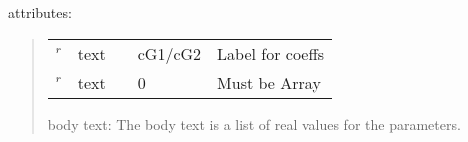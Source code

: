 \documentclass[letterpaper,10pt,english]{sphinxmanual}
\begin{document}
attributes:
\begin{quote}


\begin{savenotes}\sphinxattablestart
\centering
\begin{tabulary}{\linewidth}[t]{|T|T|T|T|T|}
\hline
\sphinxstyletheadfamily 
{}
&\sphinxstyletheadfamily 
{}
&\sphinxstyletheadfamily 
{}
&\sphinxstyletheadfamily 
{}
&\sphinxstyletheadfamily 
{}
\\
\hline
{}\(^r\)
&
text
&
&
cG1/cG2
&
Label for coeffs
\\
\hline
{}\(^r\)
&
text
&
&
0
&
Must be Array
\\
\hline
\end{tabulary}
\par
\sphinxattableend\end{savenotes}

body text: The body text is a list of real values for the parameters.
\end{quote}
\end{document}
